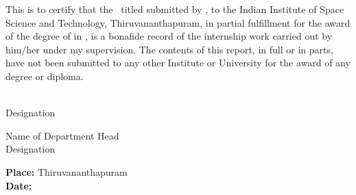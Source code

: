 This is to certify that the \Doctype\ titled \textbf{\textit{\Title}}
submitted by {\bf\Author}, to the Indian Institute of Space Science
and Technology, Thiruvananthapuram, in partial fulfillment for the
award of the degree of {\bf\Degreetext} in { \bf\Specialization}, is a
bonafide record of the internship work carried out by him/her under my
supervision. The contents of this report, in full or in parts, have
not been submitted to any other Institute or University for the award
of any degree or diploma.

\vspace{35mm}
\noindent
\begin{minipage}{0.5\textwidth}
\Advisor\\
Designation
\end{minipage}
\hspace{35mm}
\begin{minipage}{0.5\textwidth}
\raggedright{Name of Department Head}\\
Designation
\end{minipage}

\vspace{30mm}
\noindent
\textbf{Place: }Thiruvananthapuram\\
\textbf{Date: \ }\Date


